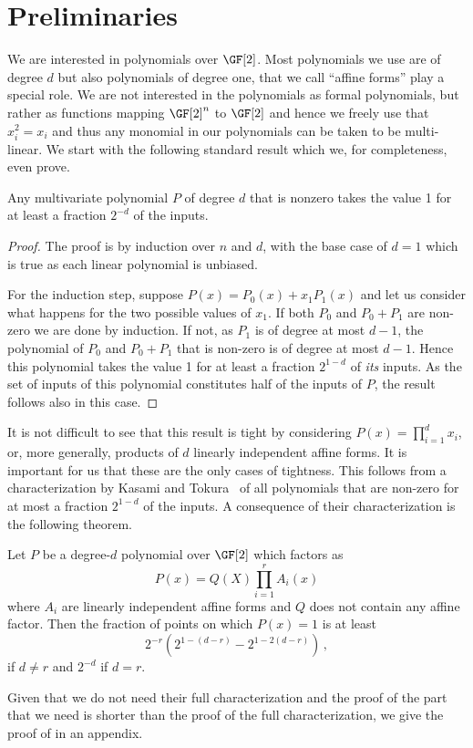 \section{Preliminaries}\label{sec: prelim}

We are interested in polynomials over $\GF[2]$.
Most polynomials we use are of
degree $d$ but also polynomials of degree one, that
we call ``affine forms'' play a special role.
We are not interested in the polynomials as formal
polynomials, but rather as functions mapping
$\GF[2]^n$ to $\GF[2]$ and hence we freely
use that $x_i^2=x_i$ and thus any
monomial in our polynomials can be taken to be multi-linear.
We start with the following standard result which we,
for completeness, even prove.

\begin{theorem}\label{thm basic deg d}
Any multivariate polynomial $P$ of degree
$d$ that is nonzero takes the
value 1 for at least a fraction
$2^{-d}$ of the inputs.
\end{theorem}


\begin{proof}
The proof is by induction over $n$ and $d$,
with the base case of $d=1$ which is true
as each linear polynomial is unbiased.

For the induction step, suppose $P(x)=P_0(x)+x_1 P_1(x)$
and let us consider what happens for the two possible
values of $x_1$.
If both $P_0$ and $P_0+P_1$ are non-zero we are
done by induction.  If not, as $P_1$ is of degree
at most $d-1$, the polynomial of $P_0$ and $P_0+P_1$ 
that is non-zero is of degree at most $d-1$.
Hence this polynomial takes the value 1 for at least a fraction $2^{1-d}$
of \emph{its} inputs.  As the set of inputs of this
polynomial constitutes half of the inputs of $P$,
the result follows also in this case.
\end{proof}

It is not difficult to see that this result is
tight by considering $P(x)=\prod_{i=1}^dx_i$,
or, more generally, products of $d$ linearly independent
affine forms.  
It is important for us
that these are the only cases of tightness.
This follows from a characterization by Kasami
and Tokura~\cite{kt70} of all polynomials
that are non-zero for at most a fraction
$2^{1-d}$ of the inputs.  
A consequence of their characterization is
the following theorem. 

\begin{theorem}\label{basic theorem}
Let $P$ be a %
degree-$d$
polynomial
over $\GF[2]$ which factors
as
$$P(x)= Q(X) \prod_{i=1}^r A_i (x) 
$$
where $A_i$ are linearly independent
affine forms and $Q$ does not
contain any affine factor.
Then the fraction of points on which $P(x)=1$
is at least
$$
2^{-r} (2^{1-(d-r)}-2^{1-2(d-r)})\,,$$
if $d\not =r$ and $2^{-d}$ if $d=r$.
\end{theorem}

Given that we do not need their full characterization
and the proof of the part that we need is shorter
than the proof of the full characterization, we
give the proof of  in
an appendix.
